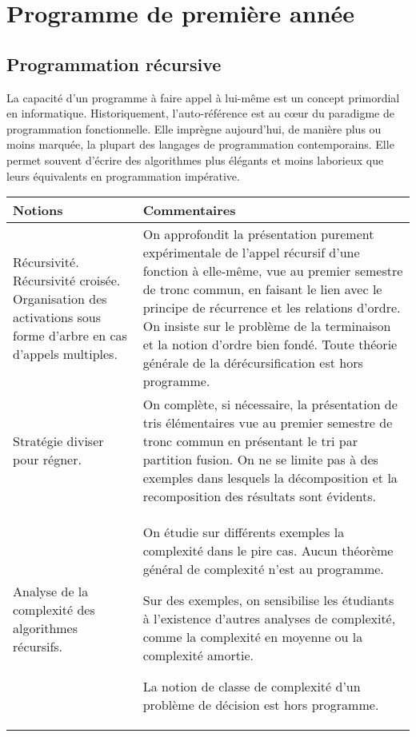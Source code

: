 \section{Programme de première année}


\subsection{Programmation récursive}

La capacité d'un programme à faire appel à lui-même est un concept primordial en informatique. Historiquement, l'auto-référence est au c\oe ur du paradigme de programmation fonctionnelle. Elle imprègne aujourd'hui, de manière plus ou moins marquée, la plupart des langages de programmation contemporains. Elle permet souvent d'écrire des algorithmes plus élégants et moins laborieux que leurs équivalents en programmation impérative.

\begin{longtable}{|p{\lnotion}|p{\comment}|}
    \hline
    \textbf{Notions} & \textbf{Commentaires} \\
    \hline\hline
    Récursivité. Récursivité croisée. Organisation des activations sous forme d'arbre en cas d'appels multiples.& On approfondit la présentation purement expérimentale de l'appel récursif d'une fonction à elle-même, vue au premier semestre de tronc commun, en faisant le lien avec le principe de récurrence et les relations d'ordre. On insiste sur le problème de la terminaison et la notion d'ordre bien fondé. Toute théorie générale de la dérécursification est hors programme.
    \\ 
    \hline
    Stratégie diviser pour régner. & On complète, si nécessaire, la présentation de tris élémentaires vue au premier semestre de tronc commun en présentant le tri par partition fusion. On ne se limite pas à des exemples dans lesquels la décomposition et la recomposition des résultats sont évidents. \\ \hline
    Analyse de la complexité des algorithmes récursifs. & On étudie sur différents exemples la complexité dans le pire cas. Aucun théorème général de complexité n'est au programme. 
    
    Sur des exemples, on sensibilise les étudiants à l'existence d'autres analyses de complexité, comme la complexité en moyenne ou la complexité amortie.
    
    La notion de classe de complexité d'un problème de décision est hors programme.\\
    \hline
\end{longtable}

